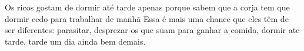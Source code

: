 \begin{poem}
\begin{stanza}
Os ricos gostam de dormir até tarde\verseline
apenas porque sabem que a corja\verseline
tem que dormir cedo para trabalhar de manhã\verseline
Essa é mais uma chance que eles\verseline
têm de ser diferentes:\verseline
parasitar,\verseline
desprezar os que suam para ganhar a comida,\verseline
dormir ate tarde,\verseline
tarde\verseline
um dia\verseline
ainda bem\verseline
demais.
\end{stanza}
\end{poem}